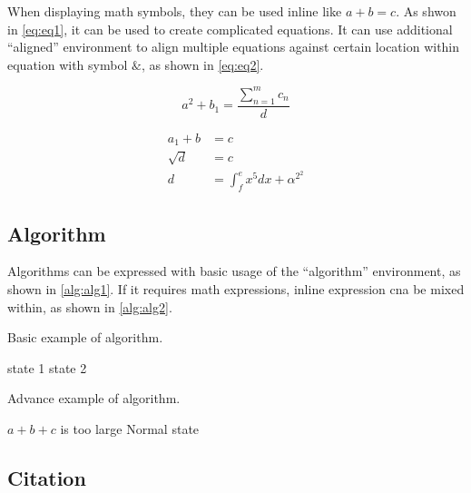 When displaying math symbols, they can be used inline like $a+b=c$. As shwon in \autoref{eq:eq1}, it can be used to create complicated equations. It can use additional \enquote{aligned} environment to align multiple equations against certain location within equation with symbol $\&$, as shown in \autoref{eq:eq2}.

\begin{equation}
    a^2+b_1=\dfrac{\sum\limits^{m}_{n=1}c_n}{d}
    \label{eq:eq1}
\end{equation}

\begin{equation}
    \begin{aligned}
        a_1+b&=c \\
        \sqrt{d}&=c \\
        d&=\int^e_fx^5dx+\alpha^{2^2}
    \label{eq:eq2}
    \end{aligned}
\end{equation}

\subsection{Algorithm}

Algorithms can be expressed with basic usage of the \enquote{algorithm} environment, as shown in \autoref{alg:alg1}. If it requires math expressions, inline expression cna be mixed within, as shown in \autoref{alg:alg2}.

\begin{algorithm}
    \caption{Basic example of algorithm.}
    \label{alg:alg1}
    \begin{algorithmic}
            \State state 1
        \Else
            \State state 2
        \EndIf
    \end{algorithmic}
\end{algorithm}

\begin{algorithm}
    \caption{Advance example of algorithm.}
    \label{alg:alg2}
    \begin{algorithmic}
            \State $a+b+c$ is too large
        \Else
            \State Normal state
        \EndIf
    \end{algorithmic}
\end{algorithm}

\subsection{Citation}
